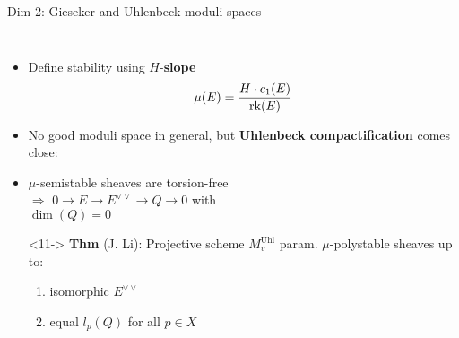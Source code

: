 \documentclass[8pt]{beamer} %
\begin{document}
\begin{frame}[fragile]{Dim 2: Gieseker and Uhlenbeck moduli spaces}
\begin{columns}[t]
        \begin{itemize}
            \item<8-> Define stability using $H$-\textbf{slope}
            \[ \mu(E) = \frac{H \cdot c_1(E)}{\operatorname{\mathrm{rk}}(E)} \]
            \item<9-> No good moduli space in general, but \textbf{Uhlenbeck compactification} comes close:
            \item<10-> $\mu$-semistable sheaves are torsion-free \\
            $\Rightarrow$ \quad $0 \to E \to E^{\vee\vee} \to Q \to 0$ \; with \\ \qquad \; $\dim(Q) = 0$
            \item[]
            \item[]<11-> \textbf{Thm} (J. Li): Projective scheme $M^{\text{Uhl}}_v$ param. $\mu$-polystable sheaves up to:
            \begin{enumerate}
                \item<12-> isomorphic $E^{\vee\vee}$ 
                \item<13-> equal $l_p(Q)$ for all $p \in X$
            \end{enumerate}
        \end{itemize}
    \end{columns}
\end{frame}
\end{document}
